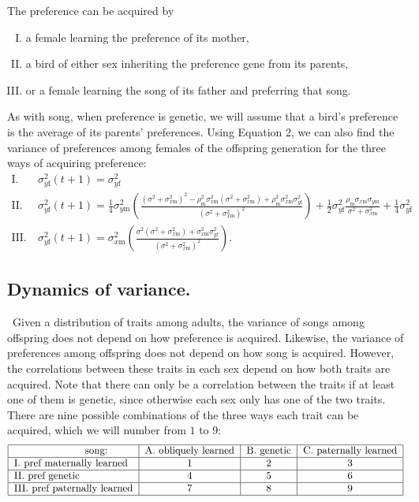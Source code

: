 \documentclass[12pt]{article}
\newcommand{\x}[1]{\text{#1}}
\begin{document}
The preference can be acquired by 
\begin{enumerate}[I.]
\item a female learning the preference of its mother,
\item a bird of either sex inheriting the preference gene from its parents,
\item or a female learning the song of its father and preferring that song.
\end{enumerate}
As with song, when preference is genetic, we will assume that a bird's preference is the average of its parents' preferences. 
Using Equation 2, we can also find the variance of preferences among females of the offspring generation for the three ways of acquiring preference:
\begin{align*}
\x{I.} \ & \sigma_{y\x{f}}^2(t+1) = \sigma_{y\x{f}}^2
\\\x{II.} \ & \sigma_{y\x{f}}^2(t+1) = \frac{1}{4}\sigma_{y\x{m}}^2\left(\frac{(\sigma^2+\sigma_{x\x{m}}^2)^2-\rho_\x{m}^2\sigma_{x\x{m}}^2(\sigma^2+\sigma_{x\x{m}}^2)+\rho_\x{m}^2\sigma_{x\x{m}}^2\sigma_{y\x{f}}^2}{(\sigma^2+\sigma_{x\x{m}}^2)^2}\right)+\frac{1}{2}\sigma_{y\x{f}}^2\frac{\rho_\x{m}\sigma_{x\x{m}}\sigma_{y\x{m}}}{\sigma^2+\sigma_{x\x{m}}^2}+\frac{1}{4}\sigma_{y\x{f}}^2
\\\x{III.} \ & \sigma_{y\x{f}}^2(t+1) = \sigma_{x\x{m}}^2\left(\frac{\sigma^2(\sigma^2+\sigma_{x\x{m}}^2)+\sigma_{ x\x{m}}^2\sigma_{y\x{f}}^2}{(\sigma^2+\sigma_{x\x{m}}^2)^2}\right).
\end{align*}

\subsection*{Dynamics of variance. }
\ Given a distribution of traits among adults, the variance of songs among offspring does not depend on how preference is acquired. Likewise, the variance of preferences among offspring does not depend on how song is acquired. However, the correlations between these traits in each sex depend on how both traits are acquired. Note that there can only be a correlation between the traits if at least one of them is genetic, since otherwise each sex only has one of the two traits. There are nine possible combinations of the three ways each trait can be acquired, which we will number from $1$ to $9$: 
\newline
\begin{equation*}
\begin{tabular}{|l|c|c|c|}
\hline\ \ \ \ \ \ \ \ \ \ \ \ \ \ \ \ \ \ \ \ \ song:  & A. obliquely learned  & B. genetic & C.  paternally learned
\\\hline I. pref maternally learned & 1 & 2 & 3
\\\hline II. pref genetic & 4 & 5 & 6
\\\hline III. pref paternally learned & 7 & 8 & 9
\\\hline
\end{tabular}
\end{equation*}
\newline
\end{document}
